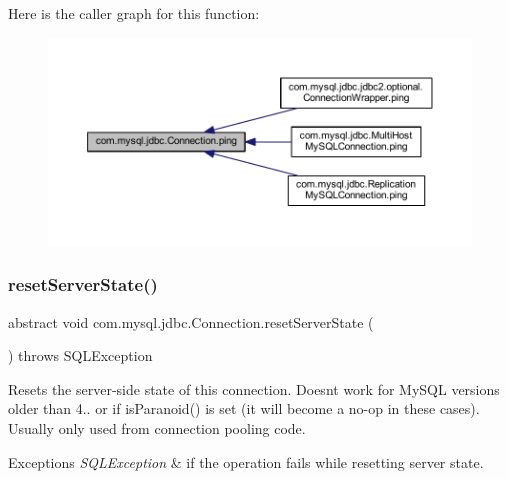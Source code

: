 Here is the caller graph for this function\+:\nopagebreak
\begin{figure}[H]
\begin{center}
\leavevmode
\includegraphics[width=350pt]{interfacecom_1_1mysql_1_1jdbc_1_1_connection_a65a9bf75714ed318b0324f99dfa09761_icgraph}
\end{center}
\end{figure}
\mbox{\label{interfacecom_1_1mysql_1_1jdbc_1_1_connection_ac618ee80c02d7672e277b3be75304f6e}} 
\subsubsection{\texorpdfstring{reset\+Server\+State()}{resetServerState()}}
{\footnotesize\ttfamily abstract void com.\+mysql.\+jdbc.\+Connection.\+reset\+Server\+State (\begin{DoxyParamCaption}{ }\end{DoxyParamCaption}) throws S\+Q\+L\+Exception\hspace{0.3cm}{\ttfamily [abstract]}}

Resets the server-\/side state of this connection. Doesn\textquotesingle{}t work for My\+S\+QL versions older than 4.. or if is\+Paranoid() is set (it will become a no-\/op in these cases). Usually only used from connection pooling code.


\begin{DoxyExceptions}{Exceptions}
{\em S\+Q\+L\+Exception} & if the operation fails while resetting server state. \\
\hline
\end{DoxyExceptions}


